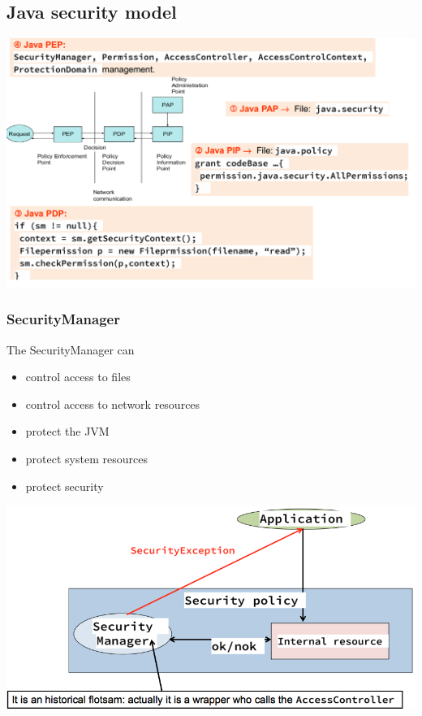 \documentclass[10pt]{article}
\begin{document}
\subsection{Java security model}
\includegraphics[scale=0.25]{java_sec_model.png}
\subsubsection{SecurityManager}
The SecurityManager can
\begin{itemize}
	\item control access to files
	\item control access to network resources
	\item protect the JVM
	\item protect system resources
	\item protect security
\end{itemize}
\begin{center}
\includegraphics[scale=0.25]{SecurityManager.png}
\end{center}
\end{document}
